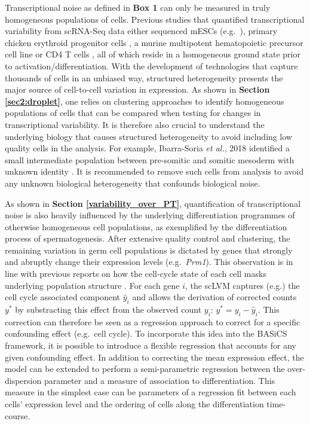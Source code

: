 Transcriptional noise as defined in \textbf{Box 1} can only be measured in truly homogeneous populations of cells. Previous studies that quantified transcriptional variability from scRNA-Seq data either sequenced mESCs (e.g.~\citep{Kolodziejczyk2015cell}), primary chicken erythroid progenitor cells \citep{Richard2016}, a murine multipotent hematopoietic precursor cell line \citep{Mojtahedi2016} or CD4\plus{} T cells \citep{Martinez-jimenez2017}, all of which reside in a homogeneous ground state prior to activation/differentiation. With the development of technologies that capture thousands of cells in an unbiased way, structured heterogeneity presents the major source of cell-to-cell variation in expression. As shown in \textbf{Section \ref{sec2:droplet}}, one relies on clustering approaches to identify homogeneous populations of cells that can be compared when testing for changes in transcriptional variability. It is therefore also crucial to understand the underlying biology that causes structured heterogeneity to avoid including low quality cells in the analysis. For example, Ibarra-Soria \emph{et al.}, 2018 identified a small intermediate population between pre-somitic and somitic mesoderm with unknown identity \citep{Ibarra-Soria2018}. It is recommended to remove such cells from analysis to avoid any unknown biological heterogeneity that confounds biological noise.

\newpage
 
As shown in \textbf{Section \ref{variability_over_PT}}, quantification of transcriptional noise is also heavily influenced by the underlying differentiation programmes of otherwise homogeneous cell populations, as exemplified by the differentiation process of spermatogenesis. After extensive quality control and clustering, the remaining variation in germ cell populations is dictated by genes that strongly and abruptly change their expression levels (e.g.~\textit{Prm1}). This observation is in line with previous reports on how the cell-cycle state of each cell masks underlying population structure \citep{Buettner2015}. For each gene $i$, the \gls{scLVM} captures (e.g.) the cell cycle associated component $\hat{y}_i$ and allows the derivation of corrected counts $y^{\ast}$ by substracting this effect from the observed count $y_i$: $y^{\ast}=y_i-\hat{y}_i$. This correction can therefore be seen as a regression approach to correct for a specific confounding effect (e.g.~cell cycle). To incorporate this idea into the BASiCS framework, it is possible to introduce a flexible regression that accounts for any given confounding effect. In addition to correcting the mean expression effect, the model can be extended to perform a semi-parametric regression between the over-dispersion parameter and a measure of association to differentiation. This measure in the simplest case can be parameters of a regression fit between each cells' expression level and the ordering of cells along the differentiation time-course. 

